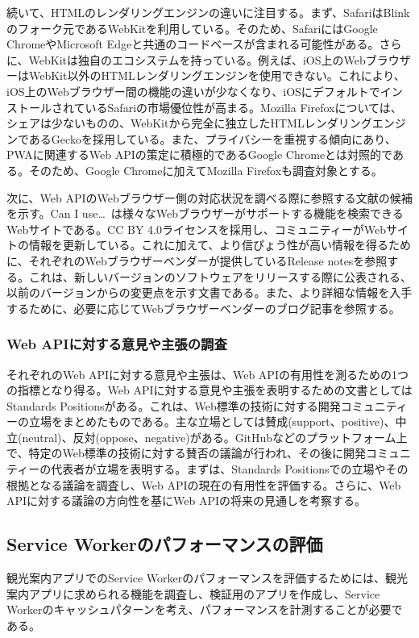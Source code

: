 続いて、HTMLのレンダリングエンジンの違いに注目する。まず、SafariはBlinkのフォーク元であるWebKitを利用している。そのため、SafariにはGoogle ChromeやMicrosoft Edgeと共通のコードベースが含まれる可能性がある。さらに、WebKitは独自のエコシステムを持っている。例えば、iOS上のWebブラウザーはWebKit以外のHTMLレンダリングエンジンを使用できない。これにより、iOS上のWebブラウザー間の機能の違いが少なくなり、iOSにデフォルトでインストールされているSafariの市場優位性が高まる。Mozilla Firefoxについては、シェアは少ないものの、WebKitから完全に独立したHTMLレンダリングエンジンであるGeckoを採用している。また、プライバシーを重視する傾向にあり、PWAに関連するWeb APIの策定に積極的であるGoogle Chromeとは対照的である。そのため、Google Chromeに加えてMozilla Firefoxも調査対象とする。

次に、Web APIのWebブラウザー側の対応状況を調べる際に参照する文献の候補を示す。Can I use…~\cite{CanIUse}は様々なWebブラウザーがサポートする機能を検索できるWebサイトである。CC BY 4.0ライセンスを採用し、コミュニティーがWebサイトの情報を更新している。これに加えて、より信ぴょう性が高い情報を得るために、それぞれのWebブラウザーベンダーが提供しているRelease notesを参照する。これは、新しいバージョンのソフトウェアをリリースする際に公表される、以前のバージョンからの変更点を示す文書である。また、より詳細な情報を入手するために、必要に応じてWebブラウザーベンダーのブログ記事を参照する。
\subsubsection{Web APIに対する意見や主張の調査}\label{subsubsection:Web APIに対する意見や主張の調査}
それぞれのWeb APIに対する意見や主張は、Web APIの有用性を測るための1つの指標となり得る。Web APIに対する意見や主張を表明するための文書としてはStandards Positionsがある。これは、Web標準の技術に対する開発コミュニティーの立場をまとめたものである。主な立場としては賛成(support、positive)、中立(neutral)、反対(oppose、negative)がある。GitHubなどのプラットフォーム上で、特定のWeb標準の技術に対する賛否の議論が行われ、その後に開発コミュニティーの代表者が立場を表明する。まずは、Standards Positionsでの立場やその根拠となる議論を調査し、Web APIの現在の有用性を評価する。さらに、Web APIに対する議論の方向性を基にWeb APIの将来の見通しを考察する。
\subsection{Service Workerのパフォーマンスの評価}\label{subsection:Service Workerのパフォーマンスの評価}
観光案内アプリでのService Workerのパフォーマンスを評価するためには、観光案内アプリに求められる機能を調査し、検証用のアプリを作成し、Service Workerのキャッシュパターンを考え、パフォーマンスを計測することが必要である。
